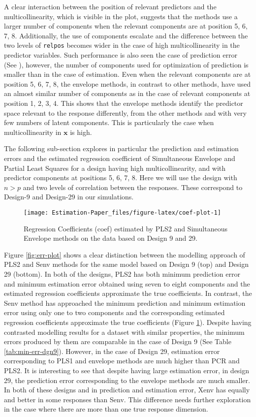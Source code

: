 \documentclass[12pt,3p,authoryear]{elsarticle}
\begin{document}
A clear interaction between the position of relevant predictors and the multicollinearity, which is visible in the plot, suggests that the methods use a larger number of components when the relevant components are at position 5, 6, 7, 8. Additionally, the use of components escalate and the difference between the two levels of \texttt{relpos} becomes wider in the case of high multicollinearity in the predictor variables. Such performance is also seen the case of prediction error (See \citet{rimal2019pred}), however, the number of components used for optimization of prediction is smaller than in the case of estimation. Even when the relevant components are at position 5, 6, 7, 8, the envelope methods, in contrast to other methods, have used an almost similar number of components as in the case of relevant components at position 1, 2, 3, 4. This shows that the envelope methods identify the predictor space relevant to the response differently, from the other methods and with very few numbers of latent components. This is particularly the case when multicollinearity in \(\mathbf{x}\) is high.

The following sub-section explores in particular the prediction and estimation errors and the estimated regression coefficient of Simultaneous Envelope and Partial Least Squares for a design having high multicollinearity, and with predictor components at positions 5, 6, 7, 8. Here we will use the design with \(n>p\) and two levels of correlation between the responses. These correspond to Design-9 and Design-29 in our simulations.

\begin{figure}
\texttt{[image: Estimation-Paper\_files/figure-latex/coef-plot-1]} \caption{Regression Coefficients (coef) estimated by PLS2 and Simultaneous Envelope methods on the data based on Design 9 and 29.}\label{fig:coef-plot}
\end{figure}

Figure \ref{fig:err-plot} shows a clear distinction between the modelling approach of PLS2 and Senv methods for the same model based on Design 9 (top) and Design 29 (bottom). In both of the designs, PLS2 has both minimum prediction error and minimum estimation error obtained using seven to eight components and the estimated regression coefficients approximate the true coefficients. In contrast, the Senv method has approached the minimum prediction and minimum estimation error using only one to two components and the corresponding estimated regression coefficients approximate the true coefficients (Figure \ref{fig:coef-plot}). Despite having contrasted modelling results for a dataset with similar properties, the minimum errors produced by them are comparable in the case of Design 9 (See Table \ref{tab:min-err-dgn9}). However, in the case of Design 29, estimation error corresponding to PLS1 and envelope methods are much higher than PCR and PLS2. It is interesting to see that despite having large estimation error, in design 29, the prediction error corresponding to the envelope methods are much smaller. In both of these designs and in prediction and estimation error, Xenv has equally and better in some responses than Senv. This difference needs further exploration in the case where there are more than one true response dimension.
\end{document}

